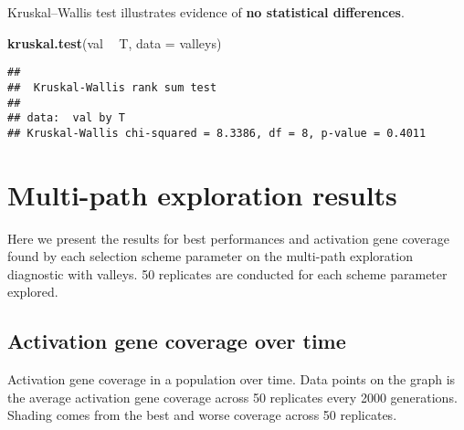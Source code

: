 \documentclass[]{book}
\newenvironment{Shaded}{\begin{snugshade}}{\end{snugshade}}
\newcommand{\DataTypeTok}[1]{\textcolor[rgb]{0.13,0.29,0.53}{#1}}
\newcommand{\KeywordTok}[1]{\textcolor[rgb]{0.13,0.29,0.53}{\textbf{#1}}}
\newcommand{\NormalTok}[1]{#1}
\newcommand{\OperatorTok}[1]{\textcolor[rgb]{0.81,0.36,0.00}{\textbf{#1}}}
\newcommand{\StringTok}[1]{\textcolor[rgb]{0.31,0.60,0.02}{#1}}
\begin{document}
Kruskal--Wallis test illustrates evidence of \textbf{no statistical differences}.

\begin{Shaded}
\begin{Highlighting}[]
\KeywordTok{kruskal.test}\NormalTok{(val }\OperatorTok{~}\StringTok{ }\NormalTok{T, }\DataTypeTok{data =}\NormalTok{ valleys)}
\end{Highlighting}
\end{Shaded}

\begin{verbatim}
## 
##  Kruskal-Wallis rank sum test
## 
## data:  val by T
## Kruskal-Wallis chi-squared = 8.3386, df = 8, p-value = 0.4011
\end{verbatim}

\hypertarget{multi-path-exploration-results-1}{%
\section{Multi-path exploration results}\label{multi-path-exploration-results-1}}

Here we present the results for best performances and activation gene coverage found by each selection scheme parameter on the multi-path exploration diagnostic with valleys.
50 replicates are conducted for each scheme parameter explored.

\hypertarget{activation-gene-coverage-over-time-3}{%
\subsection{Activation gene coverage over time}\label{activation-gene-coverage-over-time-3}}

Activation gene coverage in a population over time.
Data points on the graph is the average activation gene coverage across 50 replicates every 2000 generations.
Shading comes from the best and worse coverage across 50 replicates.

\begin{Shaded}
\end{Shaded}
\end{document}
